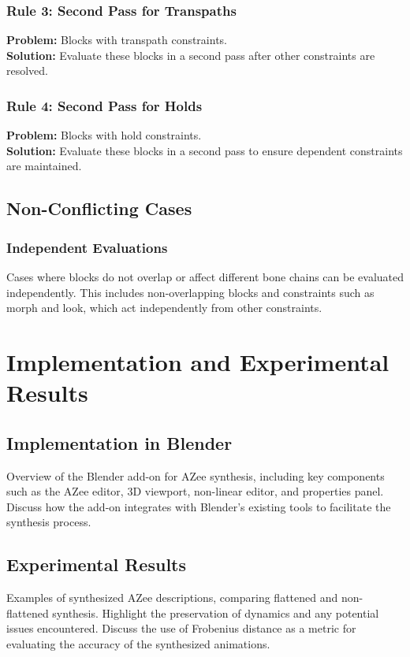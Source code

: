 \documentclass[../../main.tex]{subfiles}
\begin{document}
\subsubsection{Rule 3: Second Pass for Transpaths}
\textbf{Problem:} Blocks with transpath constraints.\\
\textbf{Solution:} Evaluate these blocks in a second pass after other constraints are resolved.

\subsubsection{Rule 4: Second Pass for Holds}
\textbf{Problem:} Blocks with hold constraints.\\
\textbf{Solution:} Evaluate these blocks in a second pass to ensure dependent constraints are maintained.

\subsection{Non-Conflicting Cases}
\subsubsection{Independent Evaluations}
Cases where blocks do not overlap or affect different bone chains can be evaluated independently. This includes non-overlapping blocks and constraints such as morph and look, which act independently from other constraints.

\section{Implementation and Experimental Results}

\subsection{Implementation in Blender}
Overview of the Blender add-on for AZee synthesis, including key components such as the AZee editor, 3D viewport, non-linear editor, and properties panel. Discuss how the add-on integrates with Blender's existing tools to facilitate the synthesis process.

\subsection{Experimental Results}
Examples of synthesized AZee descriptions, comparing flattened and non-flattened synthesis. Highlight the preservation of dynamics and any potential issues encountered. Discuss the use of Frobenius distance as a metric for evaluating the accuracy of the synthesized animations.
\end{document}
